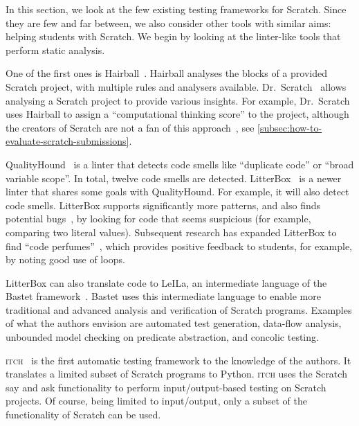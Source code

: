 \documentclass[../main]{subfiles}
\begin{document}
In this section, we look at the few existing testing frameworks for Scratch.
Since they are few and far between, we also consider other tools with similar aims: helping students with Scratch.
We begin by looking at the linter-like tools that perform static analysis.

One of the first ones is Hairball~\autocite{boeHairballLintinspiredStatic2013}.
Hairball analyses the blocks of a provided Scratch project, with multiple rules and analysers available.
Dr.\ Scratch~\autocite{moreno-leonDrScratchWeb2015} allows analysing a Scratch project to provide various insights.
For example, Dr.\ Scratch uses Hairball to assign a ``computational thinking score'' to the project, although the creators of Scratch are not a fan of this approach~\autocite{resnickCodingCrossroads2020}, see \cref{subsec:how-to-evaluate-scratch-submissions}.

QualityHound~\autocite{techapalokulQualityHoundOnline2017} is a linter that detects code smells like ``duplicate code'' or ``broad variable scope''.
In total, twelve code smells are detected.
LitterBox~\autocite{fraserLitterBoxLinterScratch2021} is a newer linter that shares some goals with QualityHound.
For example, it will also detect code smells.
LitterBox supports significantly more patterns, and also finds potential bugs~\autocite{fradrichCommonBugsScratch2020}, by looking for code that seems suspicious (for example, comparing two literal values).
Subsequent research has expanded LitterBox to find ``code perfumes''~\autocite{obermullerCodePerfumesReporting2021}, which provides positive feedback to students, for example, by noting good use of loops.

LitterBox can also translate code to LeILa, an intermediate language of the Bastet framework~\autocite{stahlbauerVerifiedScratchProgram2020}.
Bastet uses this intermediate language to enable more traditional and advanced analysis and verification of Scratch programs.
Examples of what the authors envision are automated test generation, data-flow analysis, unbounded model checking on predicate abstraction, and concolic testing.

\textsc{itch}~\autocite{johnsonITCHIndividualTesting2016} is the first automatic testing framework to the knowledge of the authors.
It translates a limited subset of Scratch programs to Python.
\textsc{itch} uses the Scratch say and ask functionality to perform input/output-based testing on Scratch projects.
Of course, being limited to input/output, only a subset of the functionality of Scratch can be used.
\end{document}
